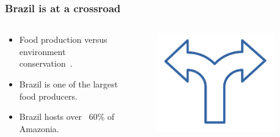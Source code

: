 \documentclass[aspectratio=169]{beamer}
\begin{document}
\begin{frame}
    \frametitle{Brazil is at a crossroad}
    \begin{columns}
        \begin{column}{0.5\textwidth}
            \begin{itemize}
                \item Food production versus environment 
                    conservation~\cite{garnett2011}.
                \item Brazil is one of the largest food producers. 
                \item Brazil hosts over ~60\% of Amazonia.
            \end{itemize}
        \end{column}
        \begin{column}{0.5\textwidth}
            \begin{figure}
                \centering
                \includegraphics[width=0.9\textwidth]{img/crossroad.png}
            \end{figure}
        \end{column}
    \end{columns}
\end{frame}
\end{document}
